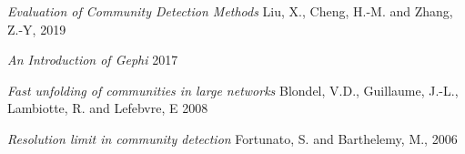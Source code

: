 \documentclass[12pt]{article}
\begin{document}
\begin{thebibliography}{100}
    \textit{Evaluation of Community Detection Methods}
    Liu, X., Cheng, H.-M. and Zhang, Z.-Y,
    2019
    
    \textit{An Introduction of Gephi}
    2017

    \textit{Fast unfolding of communities in large networks}
    Blondel, V.D., Guillaume, J.-L., Lambiotte, R. and Lefebvre, E
    2008
    
    \textit{Resolution limit in community detection}
    Fortunato, S. and Barthelemy, M.,
    2006



        
\end{thebibliography}
\end{document}
